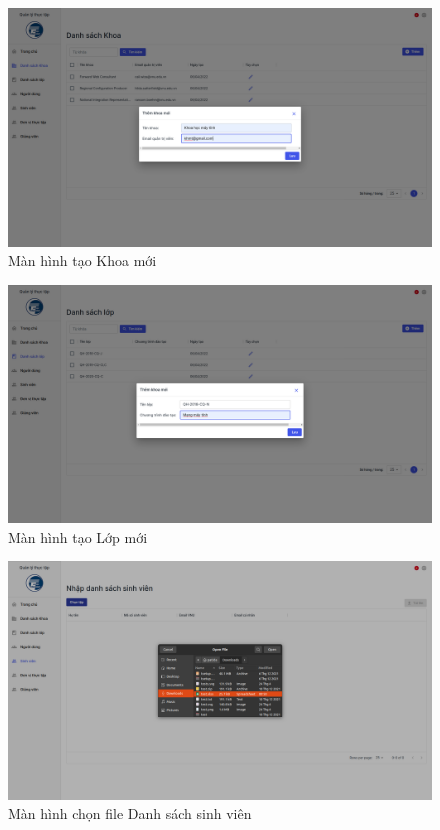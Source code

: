 \documentclass[./../main.tex]{subfiles}
\begin{document}
\begin{figure}[]
	\includegraphics[width=\linewidth]{./images/image23.png}
	\caption{Màn hình tạo Khoa mới}
	\label{fig:add_org}
\end{figure}


\begin{figure}[]
	\includegraphics[width=\linewidth]{./images/image25.png}
	\caption{Màn hình tạo Lớp mới}
	\label{fig:add_class}
\end{figure}

\begin{figure}[]
	\includegraphics[width=\linewidth]{./images/image27.png}
	\caption{Màn hình chọn file Danh sách sinh viên}
	\label{fig:choose_file}
\end{figure}
\end{document}
